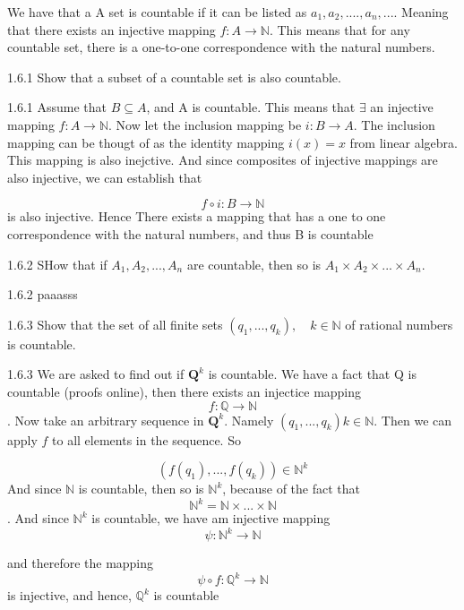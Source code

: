\documentclass[a4paper,norsk]{article}
\begin{document}
We have that a A set is countable if it can be listed as $ a_1, a_2, ...., a_n, ... $. Meaning that there exists an injective mapping $ f : A \rightarrow \mathbb{N} $. This means that for any countable set, there is a one-to-one correspondence with the natural numbers.

\begin{oppgavebox}{1.6.1}{}
Show that a subset of a countable set is also countable. 

\begin{proofbox}{1.6.1}{}
  Assume that $ B \subseteq A $, and A is countable. This means that $ \exists$ an injective mapping $ f: A \rightarrow \mathbb{N} $. Now let the inclusion mapping be $ i: B \rightarrow A $. The inclusion mapping can be thougt of as the identity mapping $ i(x) = x $ from linear algebra. This mapping is also inejctive. And since composites of injective mappings are also injective, we can establish that 
  
  \[
      f \circ i : B \rightarrow \mathbb{N}
  \]
  is also injective. Hence There exists a mapping that has a one to one correspondence with the natural numbers, and thus B is countable
\end{proofbox}
\end{oppgavebox}


\begin{oppgavebox}{1.6.2}{}
SHow that if $ A_1, A_2, ..., A_n $ are countable, then so is $ A_1 \times A_2 \times ... \times A_n $.

\begin{proofbox}{1.6.2}{}
  paaasss
\end{proofbox}
\end{oppgavebox}

\begin{oppgavebox}{1.6.3}{}
Show that the set of all finite sets $ \left( q_1, ..., q_k \right), \quad k \in \mathbb{N}  $ of rational numbers is countable.

\begin{proofbox}{1.6.3}{}
  We are asked to find out if $ \mathbf{Q}^k $ is countable. We have a fact that Q is countable (proofs online), then there exists an injectice mapping
  \[
      f: \mathbb{Q} \rightarrow \mathbb{N}
  \]
  . Now take an arbitrary sequence in $ \mathbf{Q}^k $. Namely $ \left( q_1, ..., q_k \right) k \in \mathbb{N} $. Then we can apply $ f $ to all elements in the sequence. So

  \[
      \left( f(q_1), ..., f(q_k) \right) \in \mathbb{N}^k
  \]
  And since $ \mathbb{N} $ is countable, then so is $ \mathbb{N}^k $, because of the fact that 
  \[
      \mathbb{N}^k = \mathbb{N} \times ... \times \mathbb{N}
  \]
  . And since $ \mathbb{N}^k $ is countable, we have am injective mapping 
  \[
      \psi : \mathbb{N}^k \rightarrow \mathbb{N}
  \]

  and therefore the mapping 
  \[
      \psi \circ f : \mathbb{Q}^k \rightarrow \mathbb{N}
  \]
  is injective, and hence, $ \mathbb{Q}^k $ is countable
\end{proofbox}
\end{oppgavebox}
\end{document}
